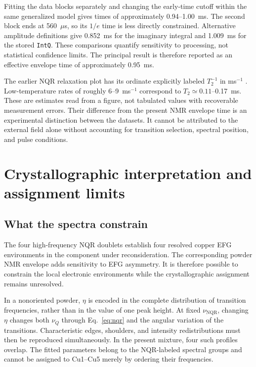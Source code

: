 \documentclass[10pt,a4paper,twocolumn]{article}
\newcommand{\nqr}{\mathrm{NQR}}
\newcommand{\nuq}{\nu_Q}
\begin{document}
Fitting the data blocks separately and changing the early-time cutoff within the same generalized model gives times of approximately 0.94--1.00~ms. The second block ends at 560~$\mu$s, so its $1/e$ time is less directly constrained. Alternative amplitude definitions give 0.852~ms for the imaginary integral and 1.009~ms for the stored \texttt{IntQ}. These comparisons quantify sensitivity to processing, not statistical confidence limits. The principal result is therefore reported as an effective envelope time of approximately 0.95~ms.

The earlier NQR relaxation plot has its ordinate explicitly labeled $T_2^{-1}$ in ms$^{-1}$ \citep[p.~29, Fig.~11]{Evlampiev2009}. Low-temperature rates of roughly 6--9~ms$^{-1}$ correspond to $T_2\simeq0.11$--0.17~ms. These are estimates read from a figure, not tabulated values with recoverable measurement errors. Their difference from the present NMR envelope time is an experimental distinction between the datasets. It cannot be attributed to the external field alone without accounting for transition selection, spectral position, and pulse conditions.

\section{Crystallographic interpretation and assignment limits}

\subsection{What the spectra constrain}

The four high-frequency NQR doublets establish four resolved copper EFG environments in the component under reconsideration. The corresponding powder NMR envelope adds sensitivity to EFG asymmetry. It is therefore possible to constrain the local electronic environments while the crystallographic assignment remains unresolved.

In a nonoriented powder, $\eta$ is encoded in the complete distribution of transition frequencies, rather than in the value of one peak height. At fixed $\nu_{\nqr}$, changing $\eta$ changes both $\nuq$ through Eq.~\eqref{eq:nqr} and the angular variation of the transitions. Characteristic edges, shoulders, and intensity redistributions must then be reproduced simultaneously. In the present mixture, four such profiles overlap. The fitted parameters belong to the NQR-labeled spectral groups and cannot be assigned to Cu1--Cu5 merely by ordering their frequencies.
\end{document}
